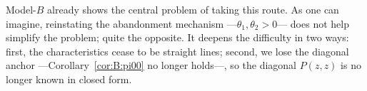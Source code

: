 \begin{remark}\label{rem:B:modelX}
    Model-$B$ already shows the central problem of taking this route. As one can imagine, reinstating the abandonment mechanism ---$\theta_1,\theta_2>0$--- does not help simplify the problem; quite the opposite. It deepens the difficulty in two ways: first, the characteristics cease to be straight lines; second, we lose the diagonal anchor ---Corollary~\ref{cor:B:pi00} no longer holds---, so the diagonal $P(z,z)$ is no longer known in closed form.
\end{remark}